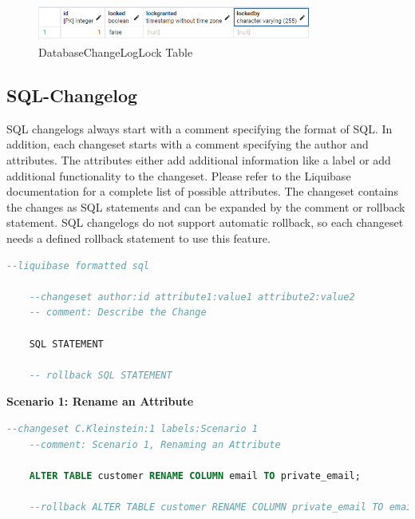 \begin{figure}[H]
	\centering
	\includegraphics[width=0.8\textwidth]{./chapters/scenarios/images/databasechangeloglock}
	\caption[DatabaseChangeLogLock Table - Source: Own illustration]{DatabaseChangeLogLock Table}
	\label{fig:scenarios:LiquibaseDBCLL}
\end{figure}


\subsection{SQL-Changelog}
%
SQL changelogs always start with a comment specifying the format of SQL. In addition, each changeset starts with a comment specifying the author and attributes. The attributes either add additional information like a label or add additional functionality to the changeset. Please refer to the Liquibase documentation \cite{Liquibase} for a complete list of possible attributes. The changeset contains the changes as SQL statements and can be expanded by the comment or rollback statement. SQL changelogs do not support automatic rollback, so each changeset needs a defined rollback statement to use this feature.

\begin{lstlisting}[language=SQL, caption={SQL Changelog with Example Changeset}, label=list:scenarios:LiquibaseSQLChangesetExample]
	--liquibase formatted sql
	
	--changeset author:id attribute1:value1 attribute2:value2
	-- comment: Describe the Change
	
	SQL STATEMENT
	
	-- rollback SQL STATEMENT
\end{lstlisting}

\textbf{Scenario 1: Rename an Attribute}\\
%
\begin{lstlisting}[language=SQL, caption={SQL Changeset Scenario 1: Rename an Attribute}, label=list:scenarions:LiquibaseSQLScen1]
	--changeset C.Kleinstein:1 labels:Scenario 1 
	--comment: Scenario 1, Renaming an Attribute
	
	ALTER TABLE customer RENAME COLUMN email TO private_email;
	
	--rollback ALTER TABLE customer RENAME COLUMN private_email TO email;
\end{lstlisting}

